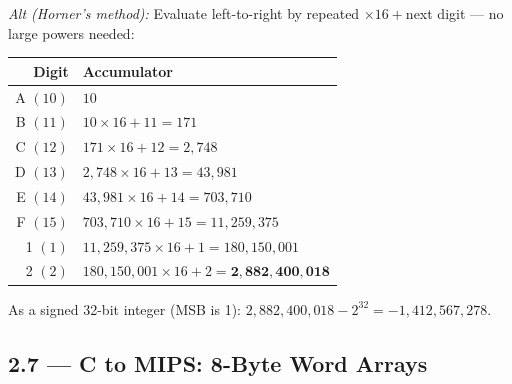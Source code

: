 \textit{Alt (Horner's method):} Evaluate left-to-right by repeated
$\times 16 +{}$next digit --- no large powers needed:

\begin{center}
\small
\begin{tabular}{rl}
\toprule
\textbf{Digit} & \textbf{Accumulator} \\
\midrule
A $(10)$ & $10$ \\
B $(11)$ & $10 \times 16 + 11 = 171$ \\
C $(12)$ & $171 \times 16 + 12 = 2{,}748$ \\
D $(13)$ & $2{,}748 \times 16 + 13 = 43{,}981$ \\
E $(14)$ & $43{,}981 \times 16 + 14 = 703{,}710$ \\
F $(15)$ & $703{,}710 \times 16 + 15 = 11{,}259{,}375$ \\
1 $(1)$  & $11{,}259{,}375 \times 16 + 1 = 180{,}150{,}001$ \\
2 $(2)$  & $180{,}150{,}001 \times 16 + 2 = \mathbf{2{,}882{,}400{,}018}$ \\
\bottomrule
\end{tabular}
\end{center}

As a signed 32-bit integer (MSB is 1):
$2{,}882{,}400{,}018 - 2^{32} = -1{,}412{,}567{,}278$.

\subsection*{2.7 --- C to MIPS: 8-Byte Word Arrays}
\hypertarget{sol-2.7}{}

